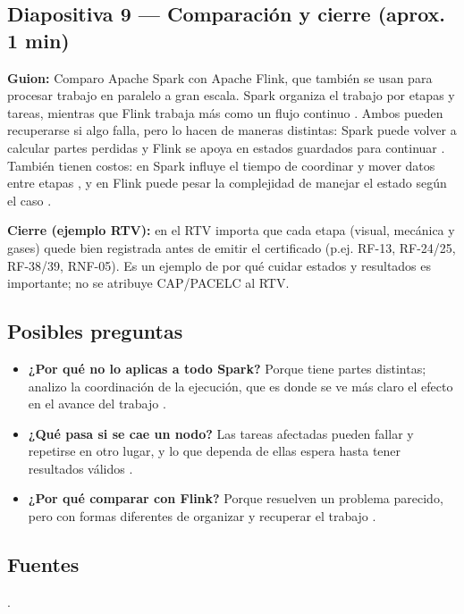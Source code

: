 \subsection*{Diapositiva 9 --- Comparación y cierre (aprox. 1 min)}
\textbf{Guion:} Comparo Apache Spark con Apache Flink, que también se usan para procesar trabajo en paralelo a gran escala. Spark organiza el trabajo por etapas y tareas, mientras que Flink trabaja más como un flujo continuo \cite{elhmadany2024,vandongen2021,javed2023}. Ambos pueden recuperarse si algo falla, pero lo hacen de maneras distintas: Spark puede volver a calcular partes perdidas y Flink se apoya en estados guardados para continuar \cite{vandongen2021,javed2023}. También tienen costos: en Spark influye el tiempo de coordinar y mover datos entre etapas \cite{mostafaei2022,elhmadany2024}, y en Flink puede pesar la complejidad de manejar el estado según el caso \cite{javed2023}.

\textbf{Cierre (ejemplo RTV):} en el RTV importa que cada etapa (visual, mecánica y gases) quede bien registrada antes de emitir el certificado (p.ej. RF-13, RF-24/25, RF-38/39, RNF-05). Es un ejemplo de por qué cuidar estados y resultados es importante; no se atribuye CAP/PACELC al RTV.

\subsection*{Posibles preguntas}
\begin{itemize}
  \item \textbf{¿Por qué no lo aplicas a todo Spark?} Porque tiene partes distintas; analizo la coordinación de la ejecución, que es donde se ve más claro el efecto en el avance del trabajo \cite{elhmadany2024,vandongen2021}.
  \item \textbf{¿Qué pasa si se cae un nodo?} Las tareas afectadas pueden fallar y repetirse en otro lugar, y lo que dependa de ellas espera hasta tener resultados válidos \cite{vandongen2021,javed2023}.
  \item \textbf{¿Por qué comparar con Flink?} Porque resuelven un problema parecido, pero con formas diferentes de organizar y recuperar el trabajo \cite{vandongen2021,javed2023}.
\end{itemize}

\subsection*{Fuentes}
\cite{vandongen2021,mostafaei2022,elhmadany2024,javed2023}.
